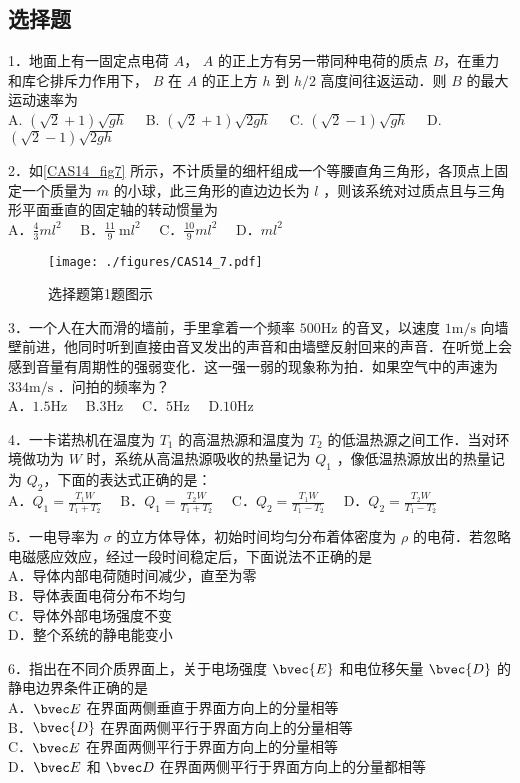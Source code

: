 
\subsection{选择题}
1．地面上有一固定点电荷 $A$， $A$ 的正上方有另一带同种电荷的质点 $B$，在重力和库仑排斥力作用下， $B$ 在 $A$ 的正上方 $h$ 到 $h/2$ 高度间往返运动．则 $B$ 的最大运动速率为\\
A. $(\sqrt{2}+1) \sqrt{g h}\quad$
B. $(\sqrt{2}+1) \sqrt{2 g h}\quad$
C. $(\sqrt{2}-1) \sqrt{g h}\quad$
D. $(\sqrt{2}-1) \sqrt{2 g h}$

2．如\autoref{CAS14_fig7} 所示，不计质量的细杆组成一个等腰直角三角形，各顶点上固定一个质量为 $m$ 的小球，此三角形的直边边长为 $l$ ，则该系统对过质点且与三角形平面垂直的固定轴的转动惯量为\\
A．$\frac{4}{3} m l^{2}\quad$
B．$\frac{11}{9} \mathrm{~m} l^{2}\quad$
C．$\frac{10}{9} m l^{2}\quad$
D．$ml^{2}$
\begin{figure}[ht]
\centering
\texttt{[image: ./figures/CAS14\_7.pdf]}
\caption{选择题第1题图示} \label{CAS14_fig7}
\end{figure}
3．一个人在大而滑的墙前，手里拿着一个频率 $500\mathrm{Hz}$ 的音叉，以速度 $1\mathrm{m/s}$ 向墙壁前进，他同时听到直接由音叉发出的声音和由墙壁反射回来的声音．在听觉上会感到音量有周期性的强弱变化．这一强一弱的现象称为拍．如果空气中的声速为 $334\mathrm{m/s}$ ．问拍的频率为？\\
A．$1.5\mathrm{Hz}\quad$ B.$3\mathrm{Hz}\quad$ C．$5\mathrm{Hz}\quad$ D.$10\mathrm{Hz}$

4．一卡诺热机在温度为 $T_1$ 的高温热源和温度为 $T_2$ 的低温热源之间工作．当对环境做功为 $W$ 时，系统从高温热源吸收的热量记为 $Q_1$ ，像低温热源放出的热量记为 $Q_2$，下面的表达式正确的是：\\

A．$Q_1=\frac{T_1W}{T_1+T_2}\quad$ B．$Q_1=\frac{T_2W}{T_1+T_2}\quad$ C．$Q_2=\frac{T_1W}{T_1-T_2}\quad$ D．$Q_2=\frac{T_2W}{T_1-T_2}$

5．一电导率为 $\sigma$ 的立方体导体，初始时间均匀分布着体密度为 $\rho$ 的电荷．若忽略电磁感应效应，经过一段时间稳定后，下面说法不正确的是\\
A．导体内部电荷随时间减少，直至为零\\
B．导体表面电荷分布不均匀\\
C．导体外部电场强度不变\\
D．整个系统的静电能变小

6．指出在不同介质界面上，关于电场强度 $\bvec{E}$ 和电位移矢量 $\bvec{D}$ 的静电边界条件正确的是\\
A．$\bvec E$ 在界面两侧垂直于界面方向上的分量相等\\
B．$\bvec{D}$ 在界面两侧平行于界面方向上的分量相等\\
C．$\bvec E$ 在界面两侧平行于界面方向上的分量相等\\
D．$\bvec E$ 和 $\bvec D$ 在界面两侧平行于界面方向上的分量都相等

